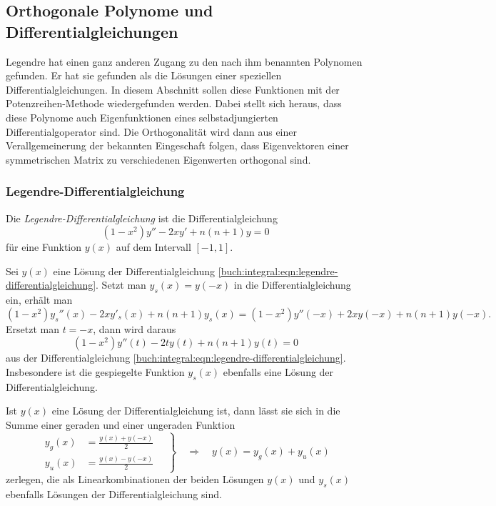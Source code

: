 %
%
%
\subsection{Orthogonale Polynome und Differentialgleichungen}
Legendre hat einen ganz anderen Zugang zu den nach ihm benannten
Polynomen gefunden.
Er hat sie gefunden als die Lösungen einer speziellen Differentialgleichungen.
In diesem Abschnitt sollen diese Funktionen mit der Potenzreihen-Methode
wiedergefunden werden.
Dabei stellt sich heraus, dass diese Polynome auch Eigenfunktionen eines
selbstadjungierten Differentialgoperator sind.
Die Orthogonalität wird dann aus einer Verallgemeinerung der bekannten
Eingeschaft folgen, dass Eigenvektoren einer symmetrischen Matrix zu 
verschiedenen Eigenwerten orthogonal sind.

\subsubsection{Legendre-Differentialgleichung}
Die {\em Legendre-Differentialgleichung} ist die Differentialgleichung
\begin{equation}
(1-x^2) y'' - 2x y' + n(n+1) y = 0
\label{buch:integral:eqn:legendre-differentialgleichung}
\end{equation}
für eine Funktion $y(x)$ auf dem Intervall $[-1,1]$.

Sei $y(x)$ eine Lösung der Differentialgleichung
\eqref{buch:integral:eqn:legendre-differentialgleichung}.
Setzt man $y_s(x)=y(-x)$ in die Differentialgleichung ein, erhält
man
\[
(1-x^2)y_s''(x) - 2x y'_s(x) + n(n+1)y_s(x)
=
(1-x^2)y''(-x) +2x y(-x) +n(n+1)y(-x).
\]
Ersetzt man $t=-x$, dann wird daraus
\[
(1-x^2)y''(t) -2t y(t) + n(n+1) y(t) = 0
\]
aus der Differentialgleichung
\eqref{buch:integral:eqn:legendre-differentialgleichung}.
Insbesondere ist die gespiegelte Funktion $y_s(x)$ ebenfalls
eine Lösung der Differentialgleichung.

Ist $y(x)$ eine Lösung der Differentialgleichung ist, dann lässt
sie sich in die Summe einer geraden und einer ungeraden Funktion
\[
\left.
\begin{aligned}
y_g(x) &= \frac{y(x)+y(-x)}{2}\\
y_u(x) &= \frac{y(x)-y(-x)}{2}
\end{aligned}
\quad
\right\}
\quad
\Rightarrow
\quad
y(x) = y_g(x) + y_u(x)
\]
zerlegen, die als Linearkombinationen der beiden Lösungen
$y(x)$ und $y_s(x)$ ebenfalls Lösungen der Differentialgleichung
sind.

